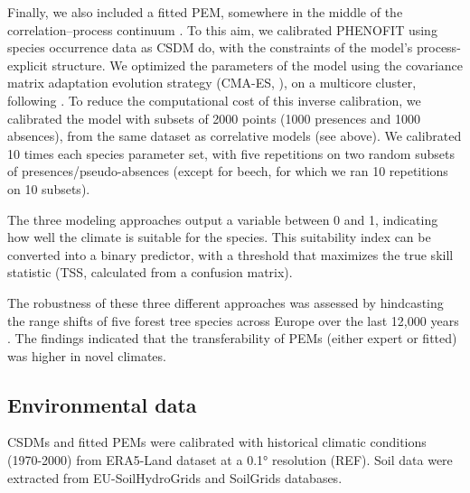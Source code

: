 \documentclass[letterpaper,8pt]{extarticle}  %
\begin{document}
\begin{doublespacing}
\begin{linenumbers}
Finally, we also included a fitted PEM, somewhere in the middle of the correlation–process continuum \citep{Dormann2012}. To this aim, we calibrated PHENOFIT using species occurrence data as CSDM do, with the constraints of the model's process-explicit structure. We optimized the parameters of the model using the covariance matrix adaptation evolution strategy (CMA-ES, \citep{Hansen2001}), on a multicore cluster, following \citet{VanderMeersch2023}. To reduce the computational cost of this inverse calibration, we calibrated the model with subsets of 2000 points (1000 presences and 1000 absences), from the same dataset as correlative models (see above). We calibrated 10 times each species parameter set, with five repetitions on two random subsets of presences/pseudo-absences (except for beech, for which we ran 10 repetitions on 10 subsets).

The three modeling approaches output a variable between 0 and 1, indicating how well the climate is suitable for the species. This suitability index can be converted into a binary predictor, with a threshold that maximizes the true skill statistic (TSS, calculated from a confusion matrix). 

The robustness of these three different approaches was assessed by hindcasting the range shifts of five forest tree species across Europe over the last 12,000 years \citep{VanderMeersch2024}. The findings indicated that the transferability of PEMs (either expert or fitted) was higher in novel climates.

\subsection{Environmental data}

CSDMs and fitted PEMs were calibrated with historical climatic conditions (1970-2000) from ERA5-Land dataset at a 0.1° resolution (REF). Soil data were extracted from EU-SoilHydroGrids \citep{Toth2017} and SoilGrids \citep{Hengl2017} databases.


\end{linenumbers}
\end{doublespacing}
\end{document}

